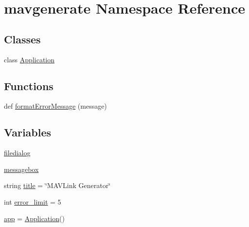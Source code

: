 \hypertarget{namespacemavgenerate}{}\section{mavgenerate Namespace Reference}
\label{namespacemavgenerate}
\subsection*{Classes}
\begin{DoxyCompactItemize}
\item 
class \mbox{\hyperlink{classmavgenerate_1_1Application}{Application}}
\end{DoxyCompactItemize}
\subsection*{Functions}
\begin{DoxyCompactItemize}
\item 
def \mbox{\hyperlink{namespacemavgenerate_ab31bafcd01eeec04a79b671fc0d3b6cb}{format\+Error\+Message}} (message)
\end{DoxyCompactItemize}
\subsection*{Variables}
\begin{DoxyCompactItemize}
\item 
\mbox{\hyperlink{namespacemavgenerate_a7b6cad00167b3e4c72880cc2ec6ae0dc}{filedialog}}
\item 
\mbox{\hyperlink{namespacemavgenerate_ac6129ad292c9e30313d3b4152e519558}{messagebox}}
\item 
string \mbox{\hyperlink{namespacemavgenerate_a0fc7c0cc014ba86fd1594a1c69a0a127}{title}} = \char`\"{}M\+A\+V\+Link Generator\char`\"{}
\item 
int \mbox{\hyperlink{namespacemavgenerate_a1761dbc960fbb664cff6f950e36a172f}{error\+\_\+limit}} = 5
\item 
\mbox{\hyperlink{namespacemavgenerate_a64f779a0ad2294831760698754204a95}{app}} = \mbox{\hyperlink{classmavgenerate_1_1Application}{Application}}()
\end{DoxyCompactItemize}


